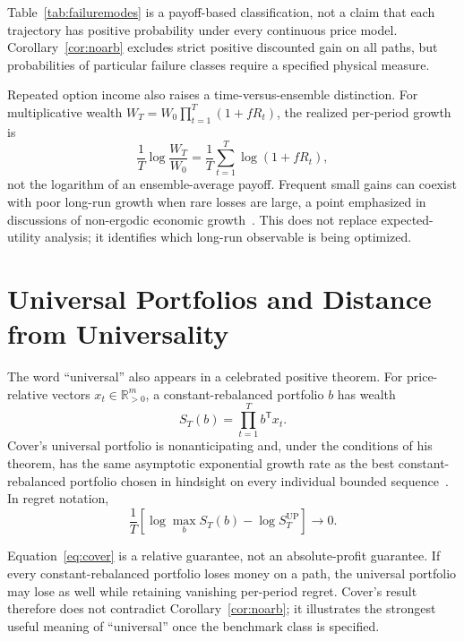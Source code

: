 \documentclass[aps,pra,reprint,superscriptaddress,amsmath,amssymb,floatfix]{revtex4-2}
\theoremstyle{plain}
\theoremstyle{definition}
\theoremstyle{remark}
\begin{document}
Table~\ref{tab:failuremodes} is a payoff-based classification, not a claim
that each trajectory has positive probability under every continuous price
model. Corollary~\ref{cor:noarb} excludes strict positive discounted gain on
all paths, but probabilities of particular failure classes require a specified
physical measure.

Repeated option income also raises a time-versus-ensemble distinction. For
multiplicative wealth \(W_T=W_0\prod_{t=1}^T(1+fR_t)\), the realized
per-period growth is
\[
  \frac1T\log\frac{W_T}{W_0}
  =\frac1T\sum_{t=1}^T\log(1+fR_t),
\]
not the logarithm of an ensemble-average payoff. Frequent small gains can
coexist with poor long-run growth when rare losses are large, a point emphasized
in discussions of non-ergodic economic growth~\cite{Peters2019}. This does not
replace expected-utility analysis; it identifies which long-run observable is
being optimized.

\section{Universal Portfolios and Distance from Universality}
\label{sec:cover}

The word ``universal'' also appears in a celebrated positive theorem.
For price-relative vectors \(x_t\in\mathbb{R}_{>0}^m\), a constant-rebalanced
portfolio \(b\) has wealth
\[
  S_T(b)=\prod_{t=1}^T b^\mathsf{T}x_t.
\]
Cover's universal portfolio is nonanticipating and, under the conditions of
his theorem, has the same asymptotic exponential growth rate as the best
constant-rebalanced portfolio chosen in hindsight on every individual bounded
sequence~\cite{Cover1991}. In regret notation,
\begin{equation}
  \frac1T\left[
  \log\max_{b}S_T(b)-\log S_T^{\mathrm{UP}}
  \right]\longrightarrow0.
  \label{eq:cover}
\end{equation}

Equation~\eqref{eq:cover} is a relative guarantee, not an absolute-profit
guarantee. If every constant-rebalanced portfolio loses money on a path, the
universal portfolio may lose as well while retaining vanishing per-period
regret. Cover's result therefore does not contradict
Corollary~\ref{cor:noarb}; it illustrates the strongest useful meaning of
``universal'' once the benchmark class is specified.
\end{document}
